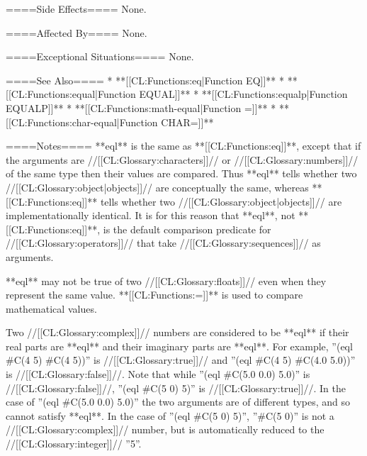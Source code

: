 ====Side Effects====
None.

====Affected By====
None.

====Exceptional Situations====
None.

====See Also====
  * **[[CL:Functions:eq|Function EQ]]**
  * **[[CL:Functions:equal|Function EQUAL]]**
  * **[[CL:Functions:equalp|Function EQUALP]]**
  * **[[CL:Functions:math-equal|Function =]]**
  * **[[CL:Functions:char-equal|Function CHAR=]]**

====Notes====
**eql** is the same as **[[CL:Functions:eq]]**, except that if the arguments are //[[CL:Glossary:characters]]// or //[[CL:Glossary:numbers]]// of the same type then their values are compared. Thus **eql** tells whether two //[[CL:Glossary:object|objects]]// are conceptually the same, whereas **[[CL:Functions:eq]]** tells whether two //[[CL:Glossary:object|objects]]// are implementationally identical. It is for this reason that **eql**, not **[[CL:Functions:eq]]**, is the default comparison predicate for //[[CL:Glossary:operators]]// that take //[[CL:Glossary:sequences]]// as arguments.

**eql** may not be true of two //[[CL:Glossary:floats]]// even when they represent the same value. **[[CL:Functions:=]]** is used to compare mathematical values.

Two //[[CL:Glossary:complex]]// numbers are considered to be **eql** if their real parts are **eql** and their imaginary parts are **eql**. For example, ''(eql #C(4 5) #C(4 5))'' is //[[CL:Glossary:true]]// and ''(eql #C(4 5) #C(4.0 5.0))'' is //[[CL:Glossary:false]]//. Note that while ''(eql #C(5.0 0.0) 5.0)'' is //[[CL:Glossary:false]]//, ''(eql #C(5 0) 5)'' is //[[CL:Glossary:true]]//. In the case of ''(eql #C(5.0 0.0) 5.0)'' the two arguments are of different types, and so cannot satisfy **eql**. In the case of ''(eql #C(5 0) 5)'', ''#C(5 0)'' is not a //[[CL:Glossary:complex]]// number, but is automatically reduced to the //[[CL:Glossary:integer]]// ''5''.


